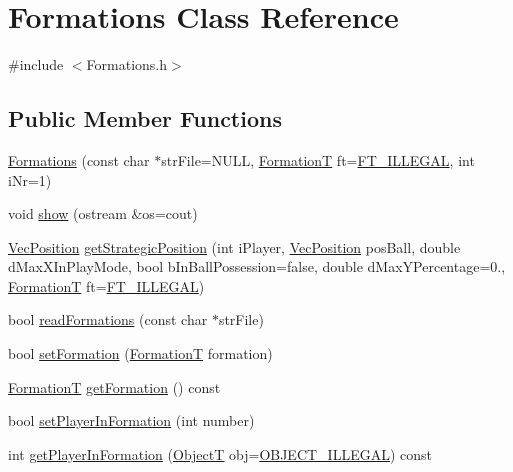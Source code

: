 \hypertarget{classFormations}{}\section{Formations Class Reference}
\label{classFormations}


{\ttfamily \#include $<$Formations.\+h$>$}

\subsection*{Public Member Functions}
\begin{DoxyCompactItemize}
\item 
\hyperlink{classFormations_a264876ee1cc41fa6e1fd7af65f56301e}{Formations} (const char $\ast$str\+File=N\+U\+LL, \hyperlink{SoccerTypes_8h_ac803bd9e3400705765031836994a385d}{FormationT} ft=\hyperlink{SoccerTypes_8h_ac803bd9e3400705765031836994a385dadf3294904b0ea24dce056d2b043429cb}{F\+T\+\_\+\+I\+L\+L\+E\+G\+AL}, int i\+Nr=1)
\item 
void \hyperlink{classFormations_a120210db61d594900bdcf06b3d33f778}{show} (ostream \&os=cout)
\item 
\hyperlink{classVecPosition}{Vec\+Position} \hyperlink{classFormations_aa22f05f42980c91bf785d781cdc550e4}{get\+Strategic\+Position} (int i\+Player, \hyperlink{classVecPosition}{Vec\+Position} pos\+Ball, double d\+Max\+X\+In\+Play\+Mode, bool b\+In\+Ball\+Possession=false, double d\+Max\+Y\+Percentage=0., \hyperlink{SoccerTypes_8h_ac803bd9e3400705765031836994a385d}{FormationT} ft=\hyperlink{SoccerTypes_8h_ac803bd9e3400705765031836994a385dadf3294904b0ea24dce056d2b043429cb}{F\+T\+\_\+\+I\+L\+L\+E\+G\+AL})
\item 
bool \hyperlink{classFormations_ac5c2bad0ac7fba6c9174b56fd13bfca7}{read\+Formations} (const char $\ast$str\+File)
\item 
bool \hyperlink{classFormations_a3cf04d1c4b05f8875c34f8e01eda5ca5}{set\+Formation} (\hyperlink{SoccerTypes_8h_ac803bd9e3400705765031836994a385d}{FormationT} formation)
\item 
\hyperlink{SoccerTypes_8h_ac803bd9e3400705765031836994a385d}{FormationT} \hyperlink{classFormations_a42e9372f624ce25d39426671a48c027c}{get\+Formation} () const 
\item 
bool \hyperlink{classFormations_a6940f63f7337071facfdb8ebc84a9eb7}{set\+Player\+In\+Formation} (int number)
\item 
int \hyperlink{classFormations_ab6f6349508af032911ec00c038246d98}{get\+Player\+In\+Formation} (\hyperlink{SoccerTypes_8h_ad4b701fa66e7d26c054ed15b7820c77c}{ObjectT} obj=\hyperlink{SoccerTypes_8h_ad4b701fa66e7d26c054ed15b7820c77cae887ec2051f19c0708a9a34df06e87a9}{O\+B\+J\+E\+C\+T\+\_\+\+I\+L\+L\+E\+G\+AL}) const 

\end{DoxyCompactItemize}
